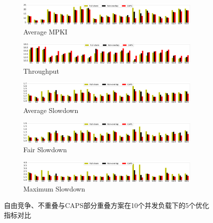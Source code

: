 \begin{figure}[htbp] 
    \centering
    \begin{subfigure}[b]{1\linewidth}
        \centering\includegraphics[width=1\linewidth]{figures/d20_miss.pdf}
        \caption{Average MPKI}
    \end{subfigure}
    \begin{subfigure}[b]{1\linewidth}
        \centering\includegraphics[width=1\linewidth]{figures/d20_ipc.pdf}
        \caption{Throughput}
    \end{subfigure}
    \begin{subfigure}[b]{1\linewidth}
        \centering\includegraphics[width=1\linewidth]{figures/d20_ws.pdf}
        \caption{Average Slowdown}
    \end{subfigure}
    \begin{subfigure}[b]{1\linewidth}
        \centering\includegraphics[width=1\linewidth]{figures/d20_fs.pdf}
        \caption{Fair Slowdown}
    \end{subfigure}
    \begin{subfigure}[b]{1\linewidth}
        \centering\includegraphics[width=1\linewidth]{figures/d20_ms.pdf}
        \caption{Maximum Slowdown}
    \end{subfigure}
    \caption{自由竞争、不重叠与CAPS部分重叠方案在10个并发负载下的5个优化指标对比}
    \label{fig:10w}
\end{figure}

